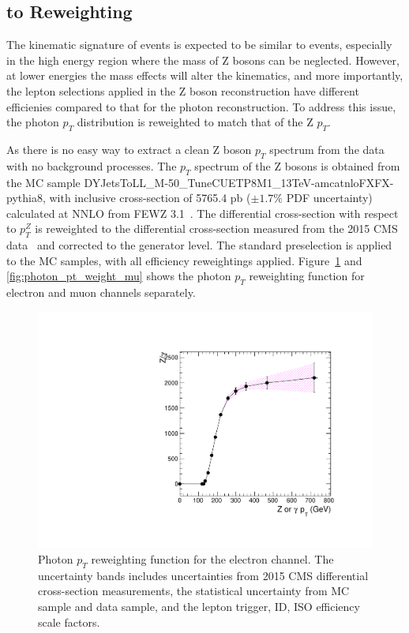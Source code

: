 \subsection{ to  Reweighting}\label{sec:bg_gjetpt}
The kinematic signature of \gjets events is expected to be similar to \Zjets events, especially in the high energy region where the mass of Z bosons can be neglected. However, at lower energies the mass effects will alter the kinematics, and more importantly, the lepton selections applied in the Z boson reconstruction have different efficienies compared to that for the photon reconstruction. To address this issue, the photon $p_T$ distribution is reweighted to match that of the Z $p_T$. 

\vspace{0.3cm}
As there is no easy way to extract a clean Z boson $p_T$ spectrum from the data with no background processes. The $p_T$ spectrum of the Z bosons is obtained from the MC sample DYJetsToLL\_M-50\_TuneCUETP8M1\_13TeV-amcatnloFXFX-pythia8, with inclusive cross-section of 5765.4 pb ($\pm 1.7\%$ PDF uncertainty) calculated at NNLO from FEWZ 3.1~\cite{bg_fewz}. The differential cross-section with respect to $p_T^Z$ is reweighted to the \Zjets differential cross-section measured from the 2015 CMS data~\cite{bg_2015zjetxsec} and corrected to the generator level. The standard preselection is applied to the MC samples, with all efficiency reweightings applied. Figure~\ref{fig:photon_pt_weight_el} and \ref{fig:photon_pt_weight_mu} shows the photon $p_T$ reweighting function for electron and muon channels separately. 

\begin{figure}[htbp]
\centering
  \includegraphics[width=0.9\linewidth]{figures/study_gjets_data_allcorV2_modify_el.pdf}
  \caption{Photon $p_T$ reweighting function for the electron channel.
 The uncertainty bands includes uncertainties from 2015 CMS \Zjets differential cross-section measurements, the statistical uncertainty from \Zjets MC sample and \gjets data sample, and the lepton trigger, ID, ISO efficiency scale factors.}
  \label{fig:photon_pt_weight_el}
\end{figure}

